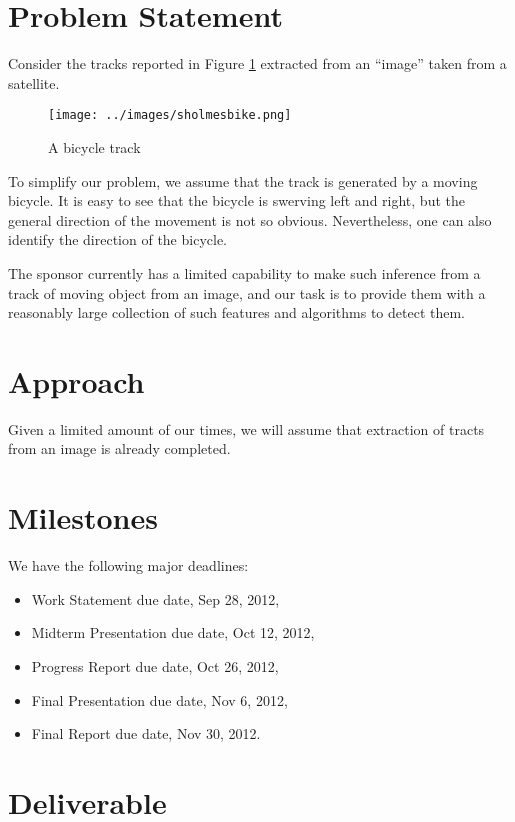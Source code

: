 \documentclass[12pt,letterpaper]{article}
\theoremstyle{definition}
\begin{document}
\section{Problem Statement}
Consider the tracks reported in Figure \ref{fig:biketrack} extracted from an
``image'' taken from a satellite. 
\begin{figure}[h]
    \begin{center}
        \texttt{[image: ../images/sholmesbike.png]}
    \end{center}
    \caption{A bicycle track}
    \label{fig:biketrack}
\end{figure}
To simplify our problem, we assume that the track is generated by a moving 
bicycle.  It is easy to see that the bicycle is swerving left and right,
but the general direction of the movement is not so obvious.  Nevertheless,
one can also identify the direction of the bicycle. 

The sponsor currently has a limited capability to make such inference from a
track of moving object from an image, and our task is to provide them with 
a reasonably large collection of such features and algorithms to detect them. 

\section{Approach}
Given a limited amount of our times, we will assume that extraction of 
tracts from an image is already completed.   
\section{Milestones}
We have the following major deadlines:
\begin{itemize}
    \item Work Statement due date, Sep 28, 2012,
    \item Midterm Presentation due date, Oct 12, 2012,
    \item Progress Report due date, Oct 26, 2012,
    \item Final Presentation due date, Nov 6, 2012,
    \item Final Report due date, Nov 30, 2012.
\end{itemize}

\section{Deliverable}
\end{document}
